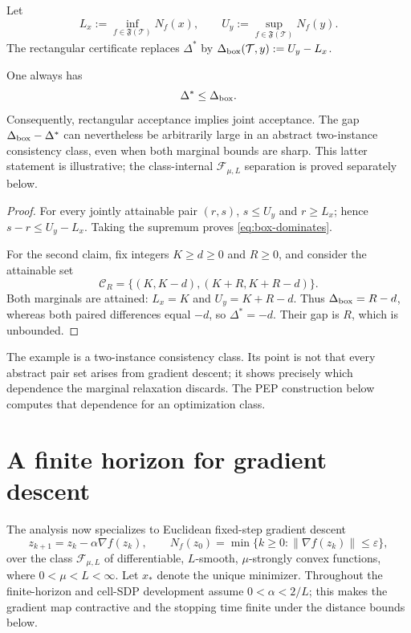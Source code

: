 \documentclass[smallextended]{svjour3}
\newcommand{\cF}{\mathcal{F}}
\newcommand{\cT}{\mathcal{T}}
\newcommand{\cC}{\mathcal{C}}
\newcommand{\norm}[1]{\lVert #1\rVert}
\newcommand{\eps}{\varepsilon}
\begin{document}
Let
\[
 L_x:=\inf_{f\in\mathfrak F(\cT)}N_f(x),\qquad
 U_y:=\sup_{f\in\mathfrak F(\cT)}N_f(y).
\]
The rectangular certificate replaces $\Delta^*$ by
$\Delta_{\rm box}(\cT,y):=U_y-L_x$.

\begin{proposition}
\label{prop:rectangle}
One always has
\begin{equation}
 \Delta^*\leq\Delta_{\rm box}.                     \label{eq:box-dominates}
\end{equation}
Consequently, rectangular acceptance implies joint acceptance.  The gap
$\Delta_{\rm box}-\Delta^*$ can nevertheless be arbitrarily large in an
abstract two-instance consistency class, even when both marginal bounds are
sharp.  This latter statement is illustrative; the class-internal
$\cF_{\mu,L}$ separation is proved separately below.
\end{proposition}

\begin{proof}
For every jointly attainable pair $(r,s)$, $s\leq U_y$ and $r\geq L_x$;
hence $s-r\leq U_y-L_x$.  Taking the supremum proves
\eqref{eq:box-dominates}.

For the second claim, fix integers $K\geq d\geq0$ and $R\geq0$, and consider
the attainable set
\[
 \cC_R=\{(K,K-d),(K+R,K+R-d)\}.
\]
Both marginals are attained: $L_x=K$ and $U_y=K+R-d$.  Thus
$\Delta_{\rm box}=R-d$, whereas both paired differences equal $-d$, so
$\Delta^*=-d$.  Their gap is $R$, which is unbounded.
\end{proof}

The example is a two-instance consistency class.  Its point is not that every
abstract pair set arises from gradient descent; it shows precisely which
dependence the marginal relaxation discards.  The PEP construction below
computes that dependence for an optimization class.

\section{A finite horizon for gradient descent}
\label{sec:horizon}

The analysis now specializes to Euclidean fixed-step gradient descent
\begin{equation}
 z_{k+1}=z_k-\alpha\nabla f(z_k),\qquad
 N_f(z_0)=\min\{k\geq0:\norm{\nabla f(z_k)}\leq\eps\},
 \label{eq:gd}
\end{equation}
over the class $\cF_{\mu,L}$ of differentiable, $L$-smooth,
$\mu$-strongly convex functions, where $0<\mu<L<\infty$.  Let $x_*$ denote
the unique minimizer.  Throughout the finite-horizon and cell-SDP development
assume $0<\alpha<2/L$; this makes the gradient map contractive and the
stopping time finite under the distance bounds below.
\end{document}
